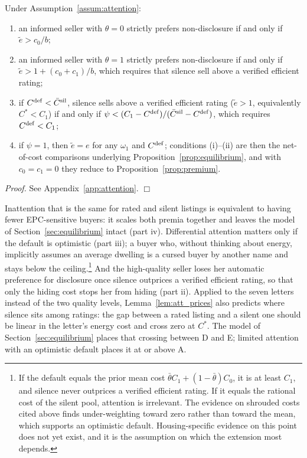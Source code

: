 \begin{proposition}
\label{prop:att_incentives}
Under Assumption~\ref{assum:attention}:
\begin{enumerate}[label=(\roman*)]
    \item an informed seller with $\theta=0$ strictly prefers non-disclosure if and only if $\tilde e>c_0/b$;
    \item an informed seller with $\theta=1$ strictly prefers non-disclosure if and only if $\tilde e>1+(c_0+c_1)/b$, which requires that silence sell above a verified efficient rating;
    \item if $C^{\rm def}<\bar C^{\rm sil}$, silence sells above a verified efficient rating ($\tilde e>1$, equivalently $C^*<C_1$) if and only if $\psi<(C_1-C^{\rm def})/(\bar C^{\rm sil}-C^{\rm def})$, which requires $C^{\rm def}<C_1$;
    \item if $\psi=1$, then $\tilde e=e$ for any $\omega_1$ and $C^{\rm def}$; conditions (i)--(ii) are then the net-of-cost comparisons underlying Proposition~\ref{prop:equilibrium}, and with $c_0=c_1=0$ they reduce to Proposition~\ref{prop:premium}.
\end{enumerate}
\end{proposition}

\noindent\textit{Proof.} See Appendix~\ref{app:attention}. $\Box$

Inattention that is the same for rated and silent listings is equivalent to having fewer EPC-sensitive buyers: it scales both premia together and leaves the model of Section~\ref{sec:equilibrium} intact (part iv). Differential attention matters only if the default is optimistic (part iii); a buyer who, without thinking about energy, implicitly assumes an average dwelling is a cursed buyer by another name and stays below the ceiling.\footnote{If the default equals the prior mean cost $\bar\theta C_1+(1-\bar\theta)C_0$, it is at least $C_1$, and silence never outprices a verified efficient rating. If it equals the rational cost of the silent pool, attention is irrelevant. The evidence on shrouded costs cited above finds under-weighting toward zero rather than toward the mean, which supports an optimistic default. Housing-specific evidence on this point does not yet exist, and it is the assumption on which the extension most depends.} And the high-quality seller loses her automatic preference for disclosure once silence outprices a verified efficient rating, so that only the hiding cost stops her from hiding (part ii). Applied to the seven letters instead of the two quality levels, Lemma~\ref{lem:att_prices} also predicts where silence sits among ratings: the gap between a rated listing and a silent one should be linear in the letter's energy cost and cross zero at $C^*$. The model of Section~\ref{sec:equilibrium} places that crossing between D and E; limited attention with an optimistic default places it at or above A.

